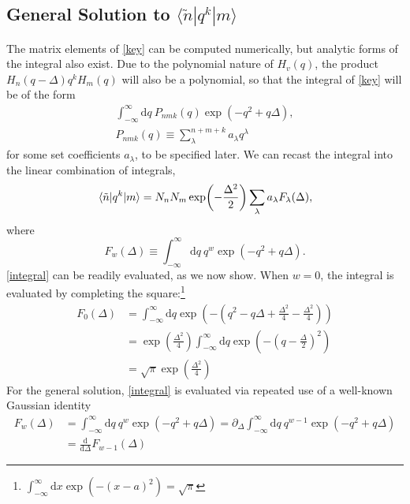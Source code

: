\documentclass[aip, jcp, reprint, onecolumn, nofootinbib]{revtex4-2}
\begin{document}
\subsection{General Solution to $\langle \tilde{n} | q^k | m \rangle$}
The matrix elements of \autoref{key} can be computed numerically, but analytic forms of the integral also exist. 
Due to the polynomial nature of $H_v(q)$, the product $H_n(q-\Delta) q^k H_m(q)$ will also be a polynomial, so that the integral of \autoref{key} will be of the form
\begin{eqnarray}
	\int_{-\infty}^\infty \mathrm{d}q \ P_{nmk}(q) \exp(-q^2 + q\Delta), \\
	P_{nmk}(q) \equiv \sum_\lambda^{n+m+k} a_\lambda q^\lambda
\end{eqnarray}
for some set coefficients $a_\lambda$, to be specified later. 
We can recast the integral into the linear combination of integrals,
\begin{equation}\label{eq:analytic_form}
	\mel{\tilde{n}}{q^k}{m} = N_n N_m \exp(-\frac{\Delta^2}{2}) \sum_\lambda a_\lambda F_\lambda(\Delta),
\end{equation}
where
\begin{equation}\label{integral}
	F_w(\Delta) \equiv \int_{-\infty}^\infty \mathrm{d}q \ q^w \exp(-q^2 + q\Delta).
\end{equation}
\autoref{integral} can be readily evaluated, as we now show. 
 When $w=0$, the integral is evaluated by completing the square:\footnote{$\int_{-\infty}^{\infty} \mathrm{d}x \exp(-(x-a)^2) = \sqrt{\pi}$}
\begin{equation}
	\begin{split}
		F_0(\Delta) &= \int_{-\infty}^\infty \mathrm{d}q \exp(-(q^2 - q\Delta +\frac{\Delta^2}{4} - \frac{\Delta^2}{4}))\\
		&= \exp(\frac{\Delta^2}{4}) \int_{-\infty}^\infty \mathrm{d}q \exp(-(q - \frac{\Delta}{2})^2) \\
		&= \sqrt{\pi} \exp(\frac{\Delta^2}{4})
	\end{split}
\end{equation}
For the general solution, \autoref{integral} is evaluated via repeated use of a well-known Gaussian identity
\begin{equation}\label{identity}
	\begin{split}
		F_w(\Delta) &= \int_{-\infty}^\infty \mathrm{d}q \ q^w \exp(-q^2 + q\Delta) = \partial_{\Delta} \int_{-\infty}^\infty \mathrm{d}q \ q^{w-1} \exp(-q^2 + q\Delta) \\
		&= \frac{\mathrm{d}}{\mathrm{d}\Delta} F_{w-1}(\Delta)
	\end{split}
\end{equation}
\end{document}
